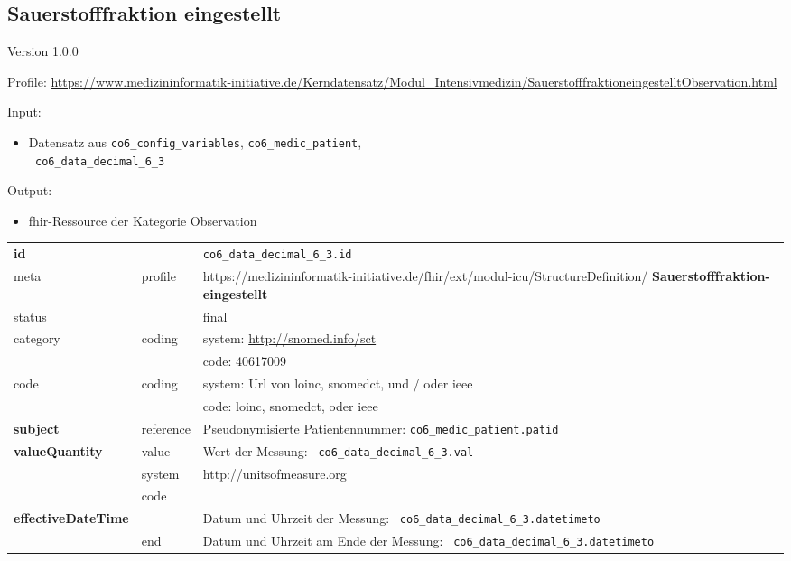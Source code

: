 \subsection{Sauerstofffraktion eingestellt} 
\noindent Version 1.0.0

\noindent Profile: \url{https://www.medizininformatik-initiative.de/Kerndatensatz/Modul_Intensivmedizin/SauerstofffraktioneingestelltObservation.html}

\noindent Input:
\begin{itemize}
	\item Datensatz aus \texttt{co6\_config\_variables}, \texttt{co6\_medic\_patient}, \\ \texttt{
co6\_data\_decimal\_6\_3}
\end{itemize}
Output:
\begin{itemize}
        \item \ac{fhir}-Ressource der Kategorie \glqq Observation\grqq{}
\end{itemize}
\begin{longtable}{|l|l|p{7.5cm}|}
        \hline
        \rowcolor{lightgray} \multicolumn{3}{|l|}{Data Mapping (inhaltlich)} \\ \hline
        \textbf{id} &  & \texttt{co6\_data\_decimal\_6\_3.id} \\ \hline
	meta & profile & https://medizininformatik-initiative.de/fhir/ext/modul-icu/StructureDefinition/\textbf{
Sauerstofffraktion-eingestellt} \\ \hline 
	status &  & final   \\ \hline 
	category & coding & system: \url{http://snomed.info/sct} \\
\cline{3-3}
	& & code: 40617009 \\ \hline
	code & coding & system: Url von \ac{loinc}, \ac{snomedct}, und / oder \ac{ieee} \\ 
	\cline{3-3} 
	 &  & code: \ac{loinc}, \ac{snomedct}, oder \ac{ieee} \\ \hline
	 \textbf{subject}  & reference & Pseudonymisierte Patientennummer: \texttt{co6\_medic\_patient.patid} \\ \hline
	 \textbf{valueQuantity}  & value & Wert der Messung: \texttt{
co6\_data\_decimal\_6\_3.val} \\
        \cline{2-3}
         & system & http://unitsofmeasure.org \\
         \cline{2-3}
         & code & \\ \hline
     \textbf{effectiveDateTime}  & & Datum und Uhrzeit der Messung: \texttt{
co6\_data\_decimal\_6\_3.datetimeto} \\
    \cline{2-3}
     & end & Datum und Uhrzeit am Ende der Messung: \texttt{
co6\_data\_decimal\_6\_3.datetimeto} \\ \hline
\end{longtable}



